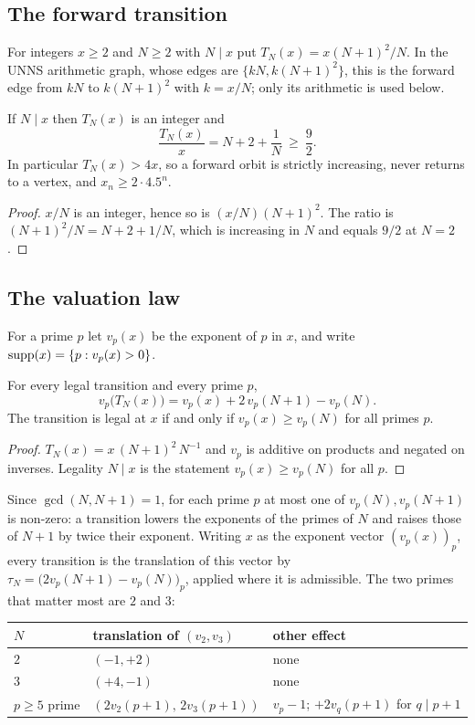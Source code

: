 \subsection{The forward transition}
For integers $x\ge2$ and $N\ge2$ with $N\mid x$ put $T_N(x)=x(N+1)^2/N$. In the UNNS arithmetic graph, whose edges are $\{kN,k(N+1)^2\}$, this is the forward edge from $kN$ to $k(N+1)^2$ with $k=x/N$; only its arithmetic is used below.
\begin{proposition}\label{prop:growth}
If $N\mid x$ then $T_N(x)$ is an integer and
\[
\frac{T_N(x)}{x}=N+2+\frac1N\ \ge\ \frac92 .
\]
In particular $T_N(x)>4x$, so a forward orbit is strictly increasing, never returns to a vertex, and $x_n\ge 2\cdot 4.5^n$.
\end{proposition}
\begin{proof} $x/N$ is an integer, hence so is $(x/N)(N+1)^2$. The ratio is $(N+1)^2/N=N+2+1/N$, which is increasing in $N$ and equals $9/2$ at $N=2$. \end{proof}

\subsection{The valuation law}
For a prime $p$ let $v_p(x)$ be the exponent of $p$ in $x$, and write $\operatorname{supp}(x)=\{p:v_p(x)>0\}$.
\begin{theorem}\label{thm:valuation}
For every legal transition and every prime $p$,
\[
\boxed{\;v_p\bigl(T_N(x)\bigr)=v_p(x)+2\,v_p(N+1)-v_p(N).\;}
\]
The transition is legal at $x$ if and only if $v_p(x)\ge v_p(N)$ for all primes $p$.
\end{theorem}
\begin{proof} $T_N(x)=x\,(N+1)^2\,N^{-1}$ and $v_p$ is additive on products and negated on inverses. Legality $N\mid x$ is the statement $v_p(x)\ge v_p(N)$ for all $p$. \end{proof}
Since $\gcd(N,N+1)=1$, for each prime $p$ at most one of $v_p(N),v_p(N+1)$ is non-zero: a transition lowers the exponents of the primes of $N$ and raises those of $N+1$ by twice their exponent. Writing $x$ as the exponent vector $(v_p(x))_p$, every transition is the translation of this vector by $\tau_N=\bigl(2v_p(N+1)-v_p(N)\bigr)_p$, applied where it is admissible. The two primes that matter most are $2$ and $3$:
\begin{center}
\begin{tabular}{@{}lll@{}}\toprule
$N$ & translation of $(v_2,v_3)$ & other effect\\\midrule
$2$ & $(-1,+2)$ & none\\
$3$ & $(+4,-1)$ & none\\
$p\ge5$ prime & $(2v_2(p{+}1),\,2v_3(p{+}1))$ & $v_p-1$; $+2v_q(p{+}1)$ for $q\mid p{+}1$\\\bottomrule
\end{tabular}
\end{center}

